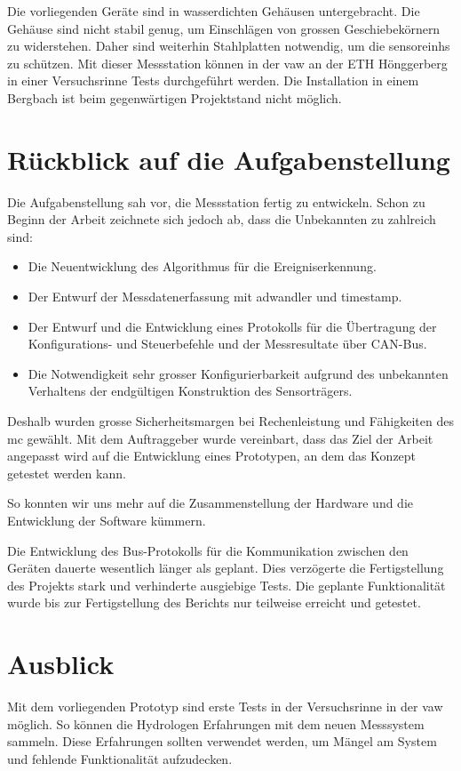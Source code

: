 Die vorliegenden Geräte sind in wasserdichten Gehäusen untergebracht. Die Gehäuse sind nicht stabil genug, um Einschlägen von grossen Geschiebekörnern zu widerstehen. Daher sind weiterhin Stahlplatten notwendig, um die \glspl{sensoreinh} zu schützen. Mit dieser Messstation können in der \gls{vaw} an der ETH Hönggerberg in einer Versuchsrinne Tests durchgeführt werden. Die Installation in einem Bergbach ist beim gegenwärtigen Projektstand nicht möglich.

\section{Rückblick auf die Aufgabenstellung}
Die Aufgabenstellung sah vor, die Messstation fertig zu entwickeln. Schon zu Beginn der Arbeit zeichnete sich jedoch ab, dass die Unbekannten zu zahlreich sind:
\begin{itemize}
\item Die Neuentwicklung des Algorithmus für die Ereigniserkennung.
\item Der Entwurf der Messdatenerfassung mit \gls{adwandler} und \gls{timestamp}.
\item Der Entwurf und die Entwicklung eines Protokolls für die Übertragung der Konfigurations- und Steuerbefehle und der Messresultate über CAN-Bus.
\item Die Notwendigkeit sehr grosser Konfigurierbarkeit aufgrund des unbekannten Verhaltens der endgültigen Konstruktion des Sensorträgers.
\end{itemize}

Deshalb wurden grosse Sicherheitsmargen bei Rechenleistung und Fähigkeiten des \gls{mc} gewählt. Mit dem Auftraggeber wurde vereinbart, dass das Ziel der Arbeit angepasst wird auf die Entwicklung eines Prototypen, an dem das Konzept getestet werden kann.

So konnten wir uns mehr auf die Zusammenstellung der Hardware und die Entwicklung der Software kümmern.

Die Entwicklung des Bus-Protokolls für die Kommunikation zwischen den Geräten dauerte wesentlich länger als geplant. Dies verzögerte die Fertigstellung des Projekts stark und verhinderte ausgiebige Tests. Die geplante Funktionalität wurde bis zur Fertigstellung des Berichts nur teilweise erreicht und getestet.

\section{Ausblick}
Mit dem vorliegenden Prototyp sind erste Tests in der Versuchsrinne in der \gls{vaw} möglich. So können die Hydrologen Erfahrungen mit dem neuen Messsystem sammeln. Diese Erfahrungen sollten verwendet werden, um Mängel am System und fehlende Funktionalität aufzudecken. 

